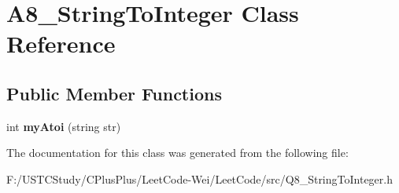 \hypertarget{class_a8___string_to_integer}{}\section{A8\+\_\+\+String\+To\+Integer Class Reference}
\label{class_a8___string_to_integer}
\subsection*{Public Member Functions}
\begin{DoxyCompactItemize}
\item 
\hypertarget{class_a8___string_to_integer_a1cf5f1bb2ab0d25d1e0dcc790da08a85}{}\label{class_a8___string_to_integer_a1cf5f1bb2ab0d25d1e0dcc790da08a85} 
int {\bfseries my\+Atoi} (string str)
\end{DoxyCompactItemize}


The documentation for this class was generated from the following file\+:\begin{DoxyCompactItemize}
\item 
F\+:/\+U\+S\+T\+C\+Study/\+C\+Plus\+Plus/\+Leet\+Code-\/\+Wei/\+Leet\+Code/src/Q8\+\_\+\+String\+To\+Integer.\+h\end{DoxyCompactItemize}
